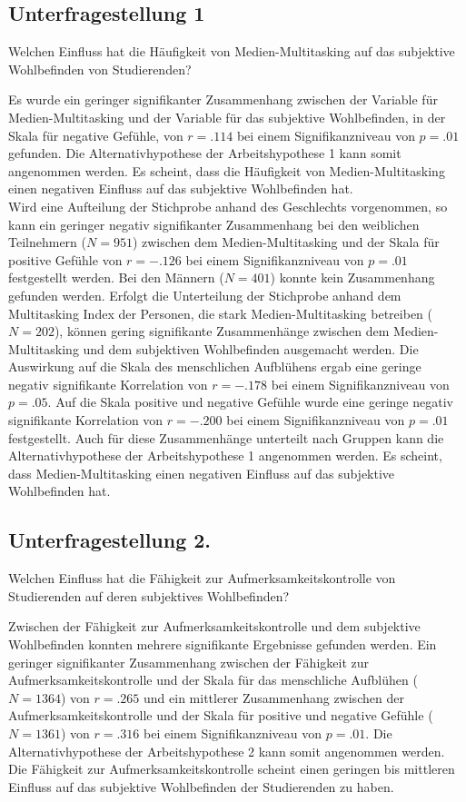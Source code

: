 \subsection{Unterfragestellung 1} Welchen Einfluss hat die Häufigkeit von Medien-Multitasking auf das subjektive Wohlbefinden von Studierenden?
\par
Es wurde ein geringer signifikanter Zusammenhang zwischen der Variable für Medien-Multitasking und der Variable für das subjektive Wohlbefinden, in der Skala für negative Gefühle, von $r=.114$ bei einem Signifikanzniveau von $p=.01$ gefunden. Die Alternativhypothese der Arbeitshypothese 1 kann somit angenommen werden. Es scheint, dass die Häufigkeit von Medien-Multitasking einen negativen Einfluss auf das subjektive Wohlbefinden hat. \\
Wird eine Aufteilung der Stichprobe anhand des Geschlechts vorgenommen, so kann ein geringer negativ signifikanter Zusammenhang bei den weiblichen Teilnehmern ($N=951$) zwischen dem Medien-Multitasking und der Skala für positive Gefühle von $r=-.126$ bei einem Signifikanzniveau von $p=.01$ festgestellt werden. Bei den Männern ($N=401$) konnte kein Zusammenhang gefunden werden. Erfolgt die Unterteilung der Stichprobe anhand dem Multitasking Index der Personen, die stark Medien-Multitasking betreiben ($N=202$), können gering signifikante Zusammenhänge zwischen dem Medien-Multitasking und dem subjektiven Wohlbefinden ausgemacht werden. Die Auswirkung auf die Skala des  menschlichen Aufblühens ergab eine geringe negativ signifikante Korrelation von $r=-.178$ bei einem Signifikanzniveau von $p=.05$. Auf die Skala positive und negative Gefühle wurde eine geringe negativ signifikante Korrelation von $r=-.200$ bei einem Signifikanzniveau von $p=.01$ festgestellt. Auch für diese Zusammenhänge unterteilt nach Gruppen kann die Alternativhypothese der Arbeitshypothese 1 angenommen werden. Es scheint, dass Medien-Multitasking einen negativen Einfluss auf das subjektive Wohlbefinden hat.

\subsection{Unterfragestellung 2.} Welchen Einfluss hat die Fähigkeit zur Aufmerksamkeitskontrolle von Studierenden auf deren subjektives Wohlbefinden?

Zwischen der Fähigkeit zur Aufmerksamkeitskontrolle und dem subjektive Wohlbefinden konnten mehrere signifikante Ergebnisse gefunden werden. Ein geringer signifikanter Zusammenhang zwischen der Fähigkeit zur Aufmerksamkeitskontrolle und der Skala für das menschliche Aufblühen ($N=1364$) von $r=.265$ und ein mittlerer Zusammenhang zwischen der Aufmerksamkeitskontrolle und der Skala für positive und negative Gefühle ($N=1361$) von $r=.316$ bei einem Signifikanzniveau von $p=.01$. Die Alternativhypothese der Arbeitshypothese 2 kann somit angenommen werden. Die Fähigkeit zur Aufmerksamkeitskontrolle scheint einen geringen bis mittleren Einfluss auf das subjektive Wohlbefinden der Studierenden zu haben.

